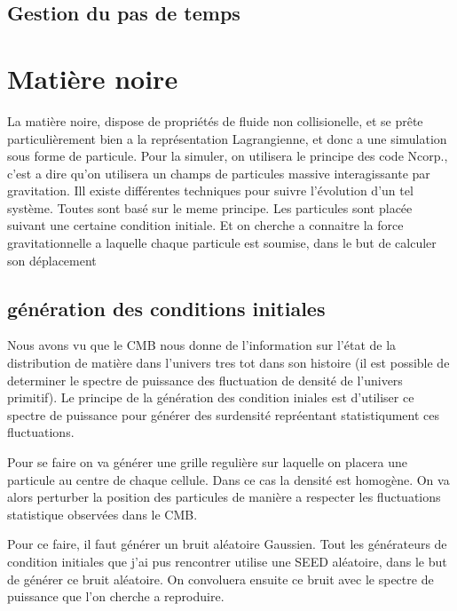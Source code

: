\subsection{Gestion du pas de temps}




\section{Matière noire}

La matière noire, dispose de propriétés de fluide non collisionelle, et se prête particulièrement bien a la représentation Lagrangienne, et donc a une simulation sous forme de particule.
Pour la simuler, on utilisera le principe des code Ncorp., c'est a dire qu'on utilisera un champs de particules massive interagissante par gravitation.
Ill existe différentes techniques pour suivre l'évolution d'un tel système.
Toutes sont basé sur le meme principe.
Les particules sont placée suivant une certaine condition initiale.
Et on cherche a connaitre la force gravitationnelle a laquelle chaque particule est soumise, dans le but de calculer son déplacement


\subsection{génération des conditions initiales}

Nous avons vu %
que le CMB nous donne de l'information sur l'état de la distribution de matière dans l'univers tres tot dans son histoire (il est possible de determiner le spectre de puissance des fluctuation de densité de l'univers primitif).
Le principe de la génération des condition iniales est d'utiliser ce spectre de puissance pour générer des surdensité repréentant statistiqument ces fluctuations.

Pour se faire on va générer une grille regulière sur laquelle on placera une particule au centre de chaque cellule.
Dans ce cas la densité est homogène.
On va alors perturber la position des particules de manière a respecter les fluctuations statistique observées dans le CMB.

Pour ce faire, il faut générer un bruit aléatoire Gaussien.
Tout les générateurs de condition initiales que j'ai pus rencontrer utilise une SEED aléatoire, dans le but de générer ce bruit aléatoire.
On convoluera ensuite ce bruit avec le spectre de puissance que l'on cherche a reproduire.


